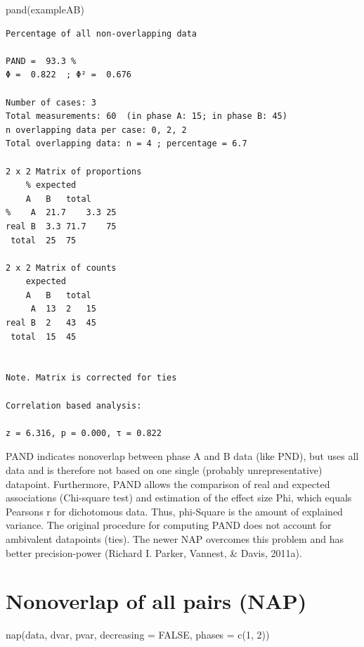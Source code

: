 \documentclass[
  letterpaper,
  DIV=11,
  numbers=noendperiod]{scrreprt}
\newenvironment{Shaded}{\begin{snugshade}}{\end{snugshade}}
\newcommand{\FunctionTok}[1]{\textcolor[rgb]{0.28,0.35,0.67}{#1}}
\newcommand{\NormalTok}[1]{\textcolor[rgb]{0.00,0.23,0.31}{#1}}
\begin{document}
\begin{Shaded}
\begin{Highlighting}[]
\FunctionTok{pand}\NormalTok{(exampleAB)}
\end{Highlighting}
\end{Shaded}

\begin{verbatim}
Percentage of all non-overlapping data

PAND =  93.3 %
Φ =  0.822  ; Φ² =  0.676 

Number of cases: 3 
Total measurements: 60  (in phase A: 15; in phase B: 45)
n overlapping data per case: 0, 2, 2
Total overlapping data: n = 4 ; percentage = 6.7 

2 x 2 Matrix of proportions
    % expected
    A   B   total
%    A  21.7    3.3 25
real B  3.3 71.7    75
 total  25  75

2 x 2 Matrix of counts
    expected
    A   B   total
     A  13  2   15
real B  2   43  45
 total  15  45


Note. Matrix is corrected for ties

Correlation based analysis:

z = 6.316, p = 0.000, τ = 0.822 
\end{verbatim}

PAND indicates nonoverlap between phase A and B data (like PND), but
uses all data and is therefore not based on one single (probably
unrepresentative) datapoint. Furthermore, PAND allows the comparison of
real and expected associations (Chi-square test) and estimation of the
effect size Phi, which equals Pearsons r for dichotomous data. Thus,
phi-Square is the amount of explained variance. The original procedure
for computing PAND does not account for ambivalent datapoints (ties).
The newer NAP overcomes this problem and has better precision-power
(Richard I. Parker, Vannest, \& Davis, 2011a).

\hypertarget{nonoverlap-of-all-pairs-nap}{%
\section{Nonoverlap of all pairs
(NAP)}\label{nonoverlap-of-all-pairs-nap}}

\begin{tcolorbox}[enhanced jigsaw, toprule=.15mm, colframe=quarto-callout-tip-color-frame, left=2mm, colback=white, breakable, bottomrule=.15mm, arc=.35mm, rightrule=.15mm, leftrule=.75mm, opacityback=0]
\begin{minipage}[t]{5.5mm}
\textcolor{quarto-callout-tip-color}{\faLightbulb}
\end{minipage}%
\begin{minipage}[t]{\textwidth - 5.5mm}
nap(data, dvar, pvar, decreasing = FALSE, phases = c(1,
2))\end{minipage}%
\end{tcolorbox}
\end{document}
